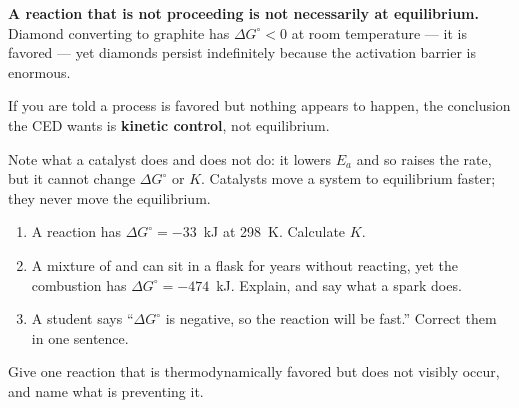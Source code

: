 \documentclass{apchem-notes}
\begin{document}
\begin{apctrap}
\textbf{A reaction that is not proceeding is not necessarily at
equilibrium.} Diamond converting to graphite has $\Delta G^\circ < 0$ at
room temperature --- it is favored --- yet diamonds persist indefinitely
because the activation barrier is enormous.

If you are told a process is favored but nothing appears to happen, the
conclusion the CED wants is \textbf{kinetic control}, not equilibrium.

Note what a catalyst does and does not do: it lowers $E_a$ and so raises the
rate, but it cannot change $\Delta G^\circ$ or $K$. Catalysts move a system
to equilibrium faster; they never move the equilibrium.
\end{apctrap}


\begin{enumerate}[leftmargin=*,itemsep=0.4em]
  \item A reaction has $\Delta G^\circ = -33$~kJ at \SI{298}{\kelvin}.
        Calculate $K$. \workspace[2.2cm]
  \item A mixture of  and  can sit in a flask for years
        without reacting, yet the combustion has
        $\Delta G^\circ = -474$~kJ. Explain, and say what a spark does.
  \item A student says ``$\Delta G^\circ$ is negative, so the reaction will
        be fast.'' Correct them in one sentence.
\end{enumerate}

\begin{exitticket}
Give one reaction that is thermodynamically favored but does not visibly
occur, and name what is preventing it.
\end{exitticket}
\end{document}
